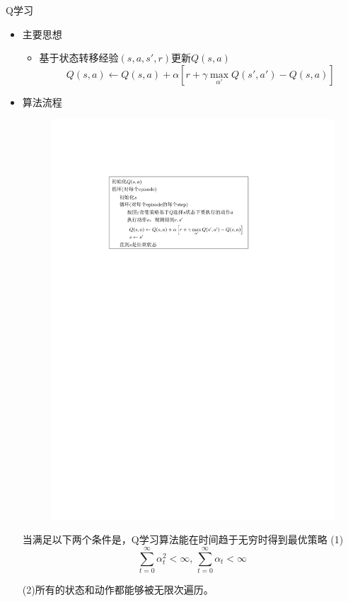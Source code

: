 \begin{note}
    Q学习
    \begin{itemize}
        \item 主要思想
        \begin{itemize}
            \item 基于状态转移经验$(s,a,s',r)$更新$Q(s,a)$
            \[
                Q(s,a)\gets Q(s,a)+\alpha\left[ r+\gamma \max\limits_{\alpha'}Q(s',a')-Q(s,a) \right]
            \]
        \end{itemize}
        \item 算法流程
        \begin{figure}[htbp]
            \centering
            \includegraphics{image/Q学习思想.pdf}
        \end{figure}
        当满足以下两个条件是，Q学习算法能在时间趋于无穷时得到最优策略
        (1)
        \[
            \sum\limits_{t = 0}^{\infty}\alpha_{t}^2< \infty,\,\sum\limits_{t = 0}^{\infty}\alpha_{t}< \infty 
        \]

        (2)所有的状态和动作都能够被无限次遍历。
    \end{itemize}
\end{note}
